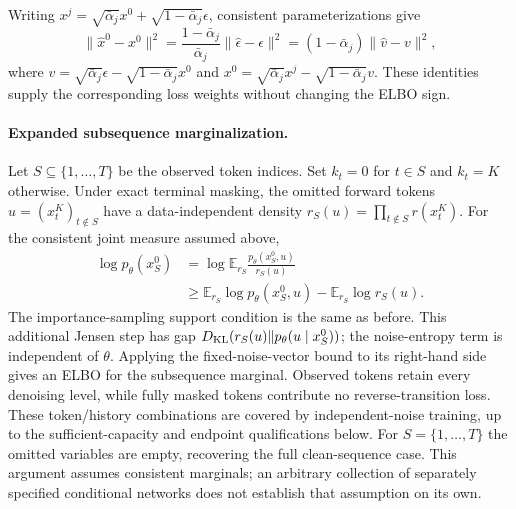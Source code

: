 Writing $x^j=\sqrt{\bar\alpha_j}x^0+\sqrt{1-\bar\alpha_j}\epsilon$, consistent parameterizations give
\[
 \|\widehat x^0-x^0\|^2=\frac{1-\bar\alpha_j}{\bar\alpha_j}\|\widehat\epsilon-\epsilon\|^2
 =(1-\bar\alpha_j)\|\widehat v-v\|^2,
\]
where $v=\sqrt{\bar\alpha_j}\epsilon-\sqrt{1-\bar\alpha_j}x^0$ and $x^0=\sqrt{\bar\alpha_j}x^j-\sqrt{1-\bar\alpha_j}v$. These identities supply the corresponding loss weights without changing the ELBO sign.

\paragraph{Expanded subsequence marginalization.}
Let $S\subseteq\{1,\ldots,T\}$ be the observed token indices. Set $k_t=0$ for $t\in S$ and $k_t=K$ otherwise. Under exact terminal masking, the omitted forward tokens $u=(x_t^K)_{t\notin S}$ have a data-independent density $r_S(u)=\prod_{t\notin S}r(x_t^K)$. For the consistent joint measure assumed above,
\begin{align*}
\log p_\theta(x_S^0)
 &=\log\mathbb E_{r_S}\frac{p_\theta(x_S^0,u)}{r_S(u)}\\
 &\geq\mathbb E_{r_S}\log p_\theta(x_S^0,u)-\mathbb E_{r_S}\log r_S(u).
\end{align*}
The importance-sampling support condition is the same as before. This additional Jensen step has gap
$D_{\rm KL}(r_S(u)\Vert p_\theta(u\mid x_S^0))$; the noise-entropy term is independent of $\theta$. Applying the fixed-noise-vector bound to its right-hand side gives an ELBO for the subsequence marginal. Observed tokens retain every denoising level, while fully masked tokens contribute no reverse-transition loss. These token/history combinations are covered by independent-noise training, up to the sufficient-capacity and endpoint qualifications below. For $S=\{1,\ldots,T\}$ the omitted variables are empty, recovering the full clean-sequence case. This argument assumes consistent marginals; an arbitrary collection of separately specified conditional networks does not establish that assumption on its own.

